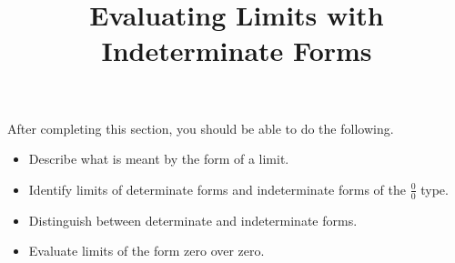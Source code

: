\documentclass{ximera}
\title{Evaluating Limits with Indeterminate Forms}
\begin{document}
\begin{abstract}
\end{abstract}
\maketitle

\begin{sectionOutcomes}
After completing this section, you should be able to do the following.

\begin{itemize}
\item Describe what is meant by the form of a limit.
\item Identify limits of determinate forms and indeterminate forms of the $\frac{0}{0}$ type.
\item Distinguish between determinate and indeterminate forms.
\item Evaluate limits of the form zero over zero.
\end{itemize}
\end{sectionOutcomes}
\end{document}
